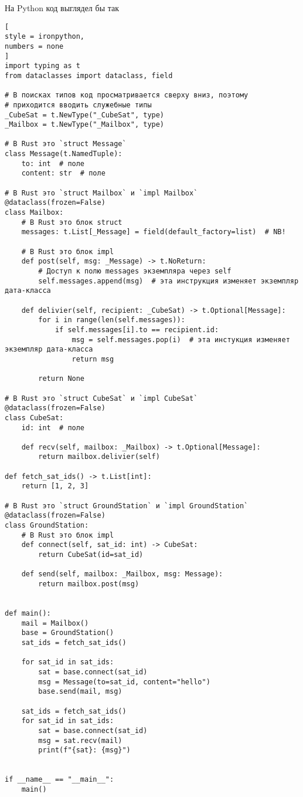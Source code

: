 \documentclass[%
	11pt,
	a4paper,
	utf8,
		]{article}
\begin{document}
На Python код выглядел бы так
\begin{lstlisting}[
style = ironpython,
numbers = none
]
import typing as t
from dataclasses import dataclass, field

# В поисках типов код просматривается сверху вниз, поэтому
# приходится вводить служебные типы
_CubeSat = t.NewType("_CubeSat", type)
_Mailbox = t.NewType("_Mailbox", type)

# В Rust это `struct Message`
class Message(t.NamedTuple):
	to: int  # поле
	content: str  # поле

# В Rust это `struct Mailbox` и `impl Mailbox`
@dataclass(frozen=False)
class Mailbox:
	# В Rust это блок struct
	messages: t.List[_Message] = field(default_factory=list)  # NB!

	# В Rust это блок impl
	def post(self, msg: _Message) -> t.NoReturn:
		# Доступ к полю messages экземпляра через self
		self.messages.append(msg)  # эта инструкция изменяет экземпляр дата-класса

	def delivier(self, recipient: _CubeSat) -> t.Optional[Message]:
		for i in range(len(self.messages)):
			if self.messages[i].to == recipient.id:
				msg = self.messages.pop(i)  # эта инстукция изменяет экземпляр дата-класса
				return msg

		return None

# В Rust это `struct CubeSat` и `impl CubeSat`
@dataclass(frozen=False)
class CubeSat:
	id: int  # поле

	def recv(self, mailbox: _Mailbox) -> t.Optional[Message]:
		return mailbox.delivier(self)

def fetch_sat_ids() -> t.List[int]:
	return [1, 2, 3]

# В Rust это `struct GroundStation` и `impl GroundStation`
@dataclass(frozen=False)
class GroundStation:
	# В Rust это блок impl
	def connect(self, sat_id: int) -> CubeSat:
		return CubeSat(id=sat_id)

	def send(self, mailbox: _Mailbox, msg: Message):
		return mailbox.post(msg)


def main():
	mail = Mailbox()
	base = GroundStation()
	sat_ids = fetch_sat_ids()

	for sat_id in sat_ids:
		sat = base.connect(sat_id)
		msg = Message(to=sat_id, content="hello")
		base.send(mail, msg)

	sat_ids = fetch_sat_ids()
	for sat_id in sat_ids:
		sat = base.connect(sat_id)
		msg = sat.recv(mail)
		print(f"{sat}: {msg}")


if __name__ == "__main__":
	main()
\end{lstlisting}
\end{document}
